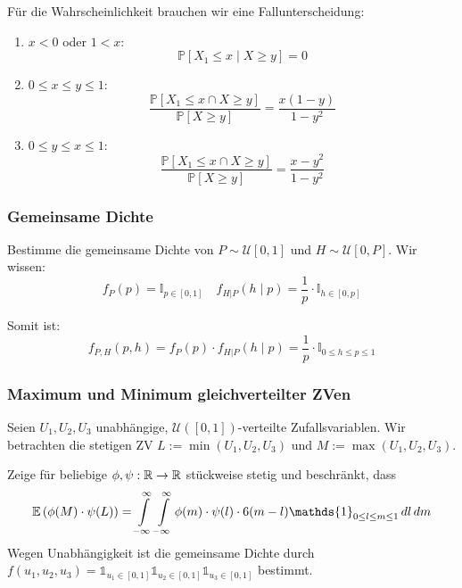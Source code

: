 Für die Wahrscheinlichkeit brauchen wir eine Fallunterscheidung: \smallskip

\begin{enumerate}
	\item \(x < 0\) oder \(1 < x\):
	      \[\mathbb{P}[X_1 \leq x \mid X \geq y] = 0\]
	\item \(0 \leq x \leq y \leq 1\):
	      \[\frac{\mathbb{P}[X_1 \leq x \cap X \geq y]}{\mathbb{P}[X \geq y]} = \frac{x(1-y)}{1 - y^2}\]
	\item \(0 \leq y \leq x \leq 1\):
	      \[\frac{\mathbb{P}[X_1 \leq x \cap X \geq y]}{\mathbb{P}[X \geq y]} = \frac{x - y^2}{1 - y^2}\]
\end{enumerate}

\subsubsection*{Gemeinsame Dichte}

Bestimme die gemeinsame Dichte von \(P \sim \mathcal{U}[0,1]\) und \(H \sim \mathcal{U}[0,P]\). Wir wissen:
\[f_P(p) = \mathbb I_{p \in [0,1]} \quad f_{H | P}(h \mid p) = \frac{1}{p} \cdot \mathbb{I}_{h \in [0,p]}\]

\noindent
Somit ist:
\[f_{P, H} (p, h) = f_P(p) \cdot f_{H | P}(h \mid p) = \frac{1}{p} \cdot \mathbb I_{0 \leq h \leq p \leq 1}\]

\subsubsection*{Maximum und Minimum gleichverteilter ZVen}
Seien $U_1, U_2, U_3$ unabhängige, $\mathcal{U}([0,1])$-verteilte Zufallsvariablen. 
Wir betrachten die stetigen ZV $L := \min(U_1, U_2, U_3)$ und $M:=\max(U_1, U_2, U_3)$.

Zeige für beliebige $\phi, \psi: \mathbb{R} \to \mathbb{R}$ stückweise stetig und beschränkt, dass 
\[\E\left(\phi(M)\cdot\psi(L)\right) = \int\limits_{-\infty}\limits^\infty \int\limits_{-\infty}\limits^\infty \phi(m) \cdot \psi(l) \cdot6(m-l)\mathds{1}_{0\leq l\leq m \leq 1}\mathop{dl}\mathop{dm}\]
Wegen Unabhängigkeit ist die gemeinsame Dichte durch $f(u_1, u_2, u_3) = \mathds{1}_{u_1 \in [0,1]}\mathds{1}_{u_2 \in [0,1]}\mathds{1}_{u_3 \in [0,1]}$ bestimmt.


